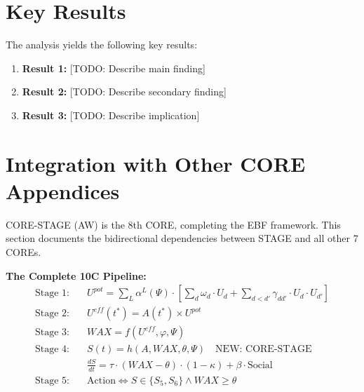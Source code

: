 

\section{Key Results}
\label{sec:results}

The analysis yields the following key results:

\begin{enumerate}
    \item \textbf{Result 1:} [TODO: Describe main finding]
    \item \textbf{Result 2:} [TODO: Describe secondary finding]
    \item \textbf{Result 3:} [TODO: Describe implication]
\end{enumerate}

\section{Integration with Other CORE Appendices}
\label{sec:bcj-integration}

CORE-STAGE (AW) is the 8th CORE, completing the EBF framework. This section documents the bidirectional dependencies between STAGE and all other 7 COREs.

\begin{tcolorbox}[colback=yellow!5!white, colframe=yellow!75!black,
    title=10C Integration: STAGE in the EBF Pipeline]

\textbf{The Complete 10C Pipeline:}
\begin{align}
\text{Stage 1:} \quad & U^{pot} = \sum_L \alpha^L(\Psi) \cdot \left[\sum_d \omega_d \cdot U_d + \sum_{d<d'} \gamma_{dd'} \cdot U_d \cdot U_{d'}\right] \\
\text{Stage 2:} \quad & U^{eff}(t^*) = A(t^*) \times U^{pot} \\
\text{Stage 3:} \quad & WAX = f(U^{eff}, \varphi, \Psi) \\
\text{Stage 4:} \quad & S(t) = h(A, WAX, \theta, \Psi) \quad \boxed{\text{NEW: CORE-STAGE}} \\
& \frac{dS}{dt} = \tau \cdot (WAX - \theta) \cdot (1-\kappa) + \beta \cdot \text{Social} \\
\text{Stage 5:} \quad & \text{Action} \Leftrightarrow S \in \{S_5, S_6\} \land WAX \geq \theta
\end{align}

\end{tcolorbox}

